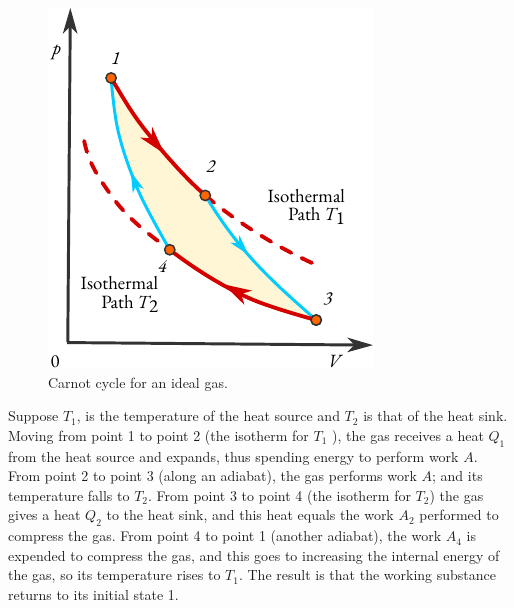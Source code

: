 \begin{figure}
\centering
\includegraphics[width=\linewidth]{figures/carnot.pdf}
\caption{Carnot cycle for an ideal gas.\label{ideal-gas}}
\end{figure}

Suppose $T_{1}$, is the temperature of the heat source and $T_{2}$ is that of the heat sink. Moving from point 1 to point 2 (the isotherm for $T_{1}$ ), the gas receives a heat $Q_{1}$ from the heat source and expands, thus spending energy to perform work $A$. From point 2 to point 3 (along an adiabat), the gas performs work $A$; and its temperature falls to $T_{2}$. From point 3 to point 4 (the isotherm for $T_{2}$) the gas gives a heat $Q_{2}$ to the heat sink, and this heat equals the work $A_{2}$ performed to compress the gas. From point 4 to point 1 (another adiabat), the work $A_{4}$ is expended to compress the gas, and this goes to increasing the internal energy of the gas, so its temperature rises to $T_{1}$. The result is that the working substance returns to its initial state 1. 

